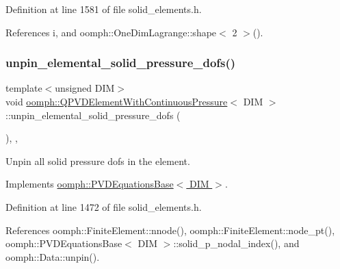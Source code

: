 Definition at line 1581 of file solid\+\_\+elements.\+h.



References i, and oomph\+::\+One\+Dim\+Lagrange\+::shape$<$ 2 $>$().

\mbox{\label{classoomph_1_1QPVDElementWithContinuousPressure_a55d0fa7d145270c4b7a8b127b9afe818}} 
\subsubsection{\texorpdfstring{unpin\+\_\+elemental\+\_\+solid\+\_\+pressure\+\_\+dofs()}{unpin\_elemental\_solid\_pressure\_dofs()}}
{\footnotesize\ttfamily template$<$unsigned D\+IM$>$ \\
void \hyperlink{classoomph_1_1QPVDElementWithContinuousPressure}{oomph\+::\+Q\+P\+V\+D\+Element\+With\+Continuous\+Pressure}$<$ D\+IM $>$\+::unpin\+\_\+elemental\+\_\+solid\+\_\+pressure\+\_\+dofs (\begin{DoxyParamCaption}{ }\end{DoxyParamCaption})\hspace{0.3cm}{\ttfamily [inline]}, {\ttfamily [private]}, {\ttfamily [virtual]}}



Unpin all solid pressure dofs in the element. 



Implements \hyperlink{classoomph_1_1PVDEquationsBase_abd9064a8651728806dda27636b1e5b50}{oomph\+::\+P\+V\+D\+Equations\+Base$<$ D\+I\+M $>$}.



Definition at line 1472 of file solid\+\_\+elements.\+h.



References oomph\+::\+Finite\+Element\+::nnode(), oomph\+::\+Finite\+Element\+::node\+\_\+pt(), oomph\+::\+P\+V\+D\+Equations\+Base$<$ D\+I\+M $>$\+::solid\+\_\+p\+\_\+nodal\+\_\+index(), and oomph\+::\+Data\+::unpin().



